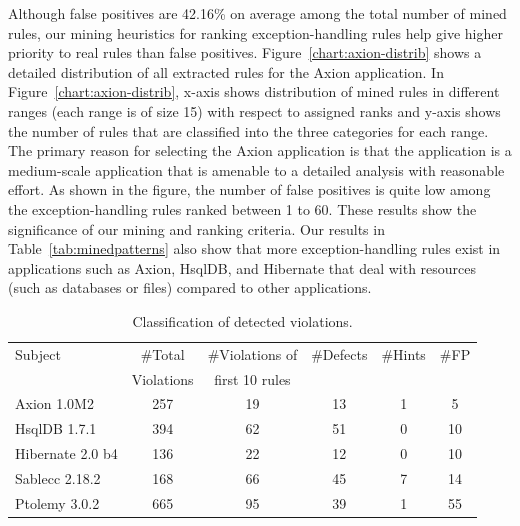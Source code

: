 Although false positives are 42.16\% on average among the total number of mined rules, our mining heuristics
for ranking exception-handling rules help give higher priority to real rules than false positives.
Figure~\ref{chart:axion-distrib} shows a detailed distribution of all extracted rules for the 
Axion application. In Figure~\ref{chart:axion-distrib}, x-axis shows distribution
of mined rules in different ranges (each range is of size 15) with respect to assigned ranks 
and y-axis shows the number of rules that are classified into
the three categories for each range. The primary reason for selecting the Axion 
application is that the application is a medium-scale application that is amenable to a detailed analysis
with reasonable effort. As shown in the figure, the number of false positives is quite low among the 
exception-handling rules ranked between 1 to 60. These results show the significance of 
our mining and ranking criteria. Our results in Table~\ref{tab:minedpatterns} 
also show that more exception-handling
rules exist in applications such as Axion, HsqlDB, and Hibernate that deal with
resources (such as databases or files) compared to other applications. 
\setlength{\tabcolsep}{1pt}
\begin{table}[t]
\begin{SmallOut}
\begin{CodeOut}
\begin{center}
\centering \caption {\label{tab:detectedbugs}  Classification of detected violations.}
\begin {tabular} {|l|c|c|c|c|c|}
\hline
Subject&\#Total&\#Violations of&\#Defects&\#Hints&\#FP\\
&Violations&first 10 rules&&&\\
\hline
\hline Axion 1.0M2&257&19&	13 &	1&	5\\
\hline HsqlDB 1.7.1&394& 62&	51 &	0&	10\\
\hline Hibernate 2.0 b4&136& 22	& 12 & 0&	10\\
\hline Sablecc 2.18.2&168& 66	&45 & 7&	14\\
\hline Ptolemy 3.0.2&665& 95	&39	& 1	& 55\\
\hline
\end{tabular}
\end{center}
\end{CodeOut}
\end{SmallOut}\vspace*{-4ex}
\end{table}

